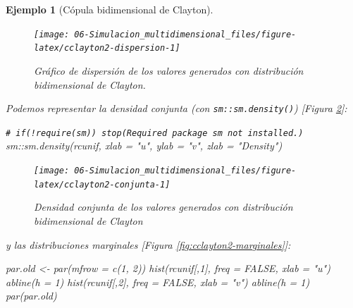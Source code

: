 \documentclass[
]{book}
\newenvironment{Shaded}{\begin{snugshade}}{\end{snugshade}}
\newcommand{\AttributeTok}[1]{\textcolor[rgb]{0.77,0.63,0.00}{#1}}
\newcommand{\CommentTok}[1]{\textcolor[rgb]{0.56,0.35,0.01}{\textit{#1}}}
\newcommand{\ConstantTok}[1]{\textcolor[rgb]{0.00,0.00,0.00}{#1}}
\newcommand{\DecValTok}[1]{\textcolor[rgb]{0.00,0.00,0.81}{#1}}
\newcommand{\FunctionTok}[1]{\textcolor[rgb]{0.00,0.00,0.00}{#1}}
\newcommand{\NormalTok}[1]{#1}
\newcommand{\OtherTok}[1]{\textcolor[rgb]{0.56,0.35,0.01}{#1}}
\newcommand{\SpecialCharTok}[1]{\textcolor[rgb]{0.00,0.00,0.00}{#1}}
\newcommand{\StringTok}[1]{\textcolor[rgb]{0.31,0.60,0.02}{#1}}
\theoremstyle{break}
\newtheorem{example}{Ejemplo}[chapter]
\theoremstyle{nonumberplain}
\renewcommand{\CommentTok}[1]{\textcolor[rgb]{0.41,0.41,0.41}{\texttt{#1}}}
\begin{document}
\begin{example}[Cópula bidimensional de Clayton]
\begin{figure}[!htb]

{\centering \texttt{[image: 06-Simulacion\_multidimensional\_files/figure-latex/cclayton2-dispersion-1]} 

}

\caption{Gráfico de dispersión de los valores generados con distribución bidimensional de Clayton.}\label{fig:cclayton2-dispersion}
\end{figure}

Podemos representar la densidad conjunta (con \texttt{sm::sm.density()}) {[}Figura \ref{fig:cclayton2-conjunta}{]}:

\begin{Shaded}
\begin{Highlighting}[]
\CommentTok{\# if(!require(sm)) stop(\textquotesingle{}Required package \textasciigrave{}sm\textasciigrave{} not installed.\textquotesingle{})}
\NormalTok{sm}\SpecialCharTok{::}\FunctionTok{sm.density}\NormalTok{(rcunif, }\AttributeTok{xlab =} \StringTok{"u"}\NormalTok{, }\AttributeTok{ylab =} \StringTok{"v"}\NormalTok{, }\AttributeTok{zlab =} \StringTok{"Density"}\NormalTok{)    }
\end{Highlighting}
\end{Shaded}

\begin{figure}[!htb]

{\centering \texttt{[image: 06-Simulacion\_multidimensional\_files/figure-latex/cclayton2-conjunta-1]} 

}

\caption{Densidad conjunta de los valores generados con distribución bidimensional de Clayton}\label{fig:cclayton2-conjunta}
\end{figure}

y las distribuciones marginales {[}Figura \ref{fig:cclayton2-marginales}{]}:

\begin{Shaded}
\begin{Highlighting}[]
\NormalTok{par.old }\OtherTok{\textless{}{-}} \FunctionTok{par}\NormalTok{(}\AttributeTok{mfrow =} \FunctionTok{c}\NormalTok{(}\DecValTok{1}\NormalTok{, }\DecValTok{2}\NormalTok{))}
\FunctionTok{hist}\NormalTok{(rcunif[,}\DecValTok{1}\NormalTok{], }\AttributeTok{freq =} \ConstantTok{FALSE}\NormalTok{, }\AttributeTok{xlab =} \StringTok{"u"}\NormalTok{)}
\FunctionTok{abline}\NormalTok{(}\AttributeTok{h =} \DecValTok{1}\NormalTok{)}
\FunctionTok{hist}\NormalTok{(rcunif[,}\DecValTok{2}\NormalTok{], }\AttributeTok{freq =} \ConstantTok{FALSE}\NormalTok{, }\AttributeTok{xlab =} \StringTok{"v"}\NormalTok{)}
\FunctionTok{abline}\NormalTok{(}\AttributeTok{h =} \DecValTok{1}\NormalTok{)}
\FunctionTok{par}\NormalTok{(par.old)}
\end{Highlighting}
\end{Shaded}


\end{example}
\end{document}
